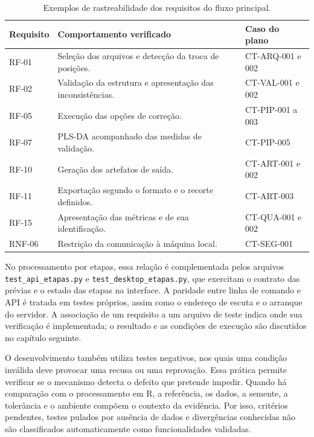 \begin{table}[htbp]
\centering
\caption{Exemplos de rastreabilidade dos requisitos do fluxo principal.}
\label{tab:4-rastreabilidade}
\small
\begin{tabularx}{\textwidth}{|l|X|l|}
\hline
\textbf{Requisito} & \textbf{Comportamento verificado} & \textbf{Caso do plano} \\ \hline
RF-01 & Seleção dos arquivos e detecção da troca de posições. & CT-ARQ-001 e 002 \\ \hline
RF-02 & Validação da estrutura e apresentação das inconsistências. & CT-VAL-001 e 002 \\ \hline
RF-05 & Execução das opções de correção. & CT-PIP-001 a 003 \\ \hline
RF-07 & PLS-DA acompanhado das medidas de validação. & CT-PIP-005 \\ \hline
RF-10 & Geração dos artefatos de saída. & CT-ART-001 e 002 \\ \hline
RF-11 & Exportação segundo o formato e o recorte definidos. & CT-ART-003 \\ \hline
RF-15 & Apresentação das métricas e de sua identificação. & CT-QUA-001 e 002 \\ \hline
RNF-06 & Restrição da comunicação à máquina local. & CT-SEG-001 \\ \hline
\end{tabularx}
\par{}
\end{table}

No processamento por etapas, essa relação é complementada pelos arquivos \texttt{test\_api\_etapas.py} e \texttt{test\_desktop\_etapas.py}, que exercitam o contrato das prévias e o estado das etapas na interface. A paridade entre linha de comando e API é tratada em testes próprios, assim como o endereço de escuta e o arranque do servidor. A associação de um requisito a um arquivo de teste indica onde sua verificação é implementada; o resultado e as condições de execução são discutidos no capítulo seguinte.

O desenvolvimento também utiliza testes negativos, nos quais uma condição inválida deve provocar uma recusa ou uma reprovação. Essa prática permite verificar se o mecanismo detecta o defeito que pretende impedir. Quando há comparação com o processamento em R, a referência, os dados, a semente, a tolerância e o ambiente compõem o contexto da evidência. Por isso, critérios pendentes, testes pulados por ausência de dados e divergências conhecidas não são classificados automaticamente como funcionalidades validadas.

